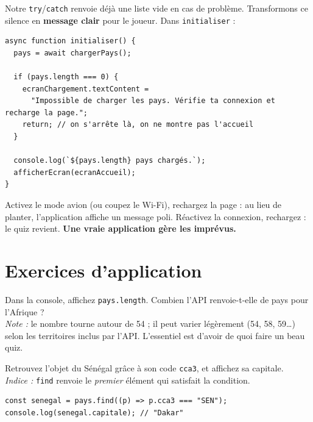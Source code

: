 \documentclass[11pt,a4paper]{article}
\newcommand{\code}[1]{\texttt{#1}}
\begin{document}
Notre \code{try}/\code{catch} renvoie déjà une liste vide en cas de problème. Transformons ce silence en \textbf{message clair} pour le joueur. Dans \code{initialiser} :

\begin{lstlisting}[style=js]
async function initialiser() {
  pays = await chargerPays();

  if (pays.length === 0) {
    ecranChargement.textContent =
      "Impossible de charger les pays. Vérifie ta connexion et recharge la page.";
    return; // on s'arrête là, on ne montre pas l'accueil
  }

  console.log(`${pays.length} pays chargés.`);
  afficherEcran(ecranAccueil);
}
\end{lstlisting}

\begin{infobox}
Activez le mode avion (ou coupez le Wi-Fi), rechargez la page : au lieu de planter, l'application affiche un message poli. Réactivez la connexion, rechargez : le quiz revient. \textbf{Une vraie application gère les imprévus.}
\end{infobox}

\section{Exercices d'application}

\begin{objectifbox}
Dans la console, affichez \code{pays.length}. Combien l'API renvoie-t-elle de pays pour l'Afrique ?\\
\emph{Note :} le nombre tourne autour de 54 ; il peut varier légèrement (54, 58, 59\ldots) selon les territoires inclus par l'API. L'essentiel est d'avoir de quoi faire un beau quiz.
\end{objectifbox}

\begin{objectifbox}
Retrouvez l'objet du Sénégal grâce à son code \code{cca3}, et affichez sa capitale.\\
\emph{Indice :} \code{find} renvoie le \emph{premier} élément qui satisfait la condition.
\end{objectifbox}

\begin{lstlisting}[style=js]
const senegal = pays.find((p) => p.cca3 === "SEN");
console.log(senegal.capitale); // "Dakar"
\end{lstlisting}
\end{document}
